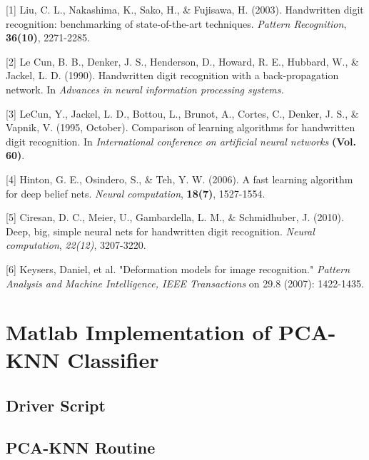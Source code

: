 \documentclass{article} %
\begin{document}
\small{
[1] Liu, C. L., Nakashima, K., Sako, H., \& Fujisawa, H. (2003). Handwritten
digit recognition: benchmarking of state-of-the-art techniques. {\it Pattern
    Recognition}, {\bf 36(10)}, 2271-2285.

[2] Le Cun, B. B., Denker, J. S., Henderson, D., Howard, R. E., Hubbard, W., \&
Jackel, L. D. (1990). Handwritten digit recognition with a back-propagation
network. In {\it Advances in neural information processing systems.}

[3] LeCun, Y., Jackel, L. D., Bottou, L., Brunot, A., Cortes, C., Denker, J.
S., \& Vapnik, V. (1995, October). Comparison of learning algorithms for
handwritten digit recognition. In {\it International conference on artificial
    neural networks} {\bf (Vol. 60)}.

[4] Hinton, G. E., Osindero, S., \& Teh, Y. W. (2006). A fast learning
algorithm for deep belief nets. {\it Neural computation}, {\bf 18(7)}, 1527-1554.

[5] Ciresan, D. C., Meier, U., Gambardella, L. M., \& Schmidhuber, J. (2010).
Deep, big, simple neural nets for handwritten digit recognition. {\it Neural
    computation}, {\it 22(12)}, 3207-3220.

[6] Keysers, Daniel, et al. "Deformation models for image recognition."
{\it Pattern Analysis and Machine Intelligence, IEEE Transactions} on 29.8 (2007):
1422-1435.
}

\newpage
\appendix

\section{Matlab Implementation of PCA-KNN Classifier}
\subsection{Driver Script}

\subsection{PCA-KNN Routine}

\end{document}
